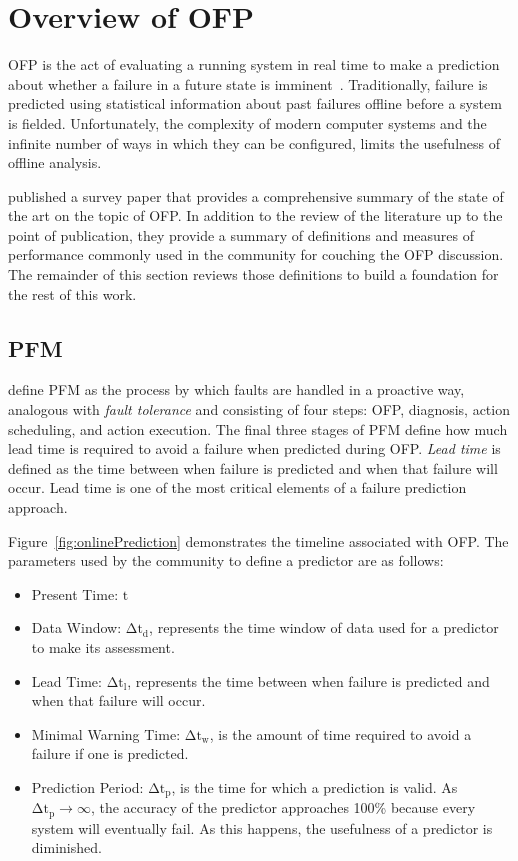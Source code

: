 \section{Overview of \acrfull{OFP}} \label{chapter2}
\ac{OFP} is the act of evaluating a running system in real time to make a
prediction about whether a failure in a future state is
imminent~\citep{salfnerSurvey}.  Traditionally, failure is predicted using
statistical information about past failures offline before a system is fielded.
Unfortunately, the complexity of modern computer systems and the infinite
number of ways in which they can be configured, limits the usefulness of
offline analysis.

\citet{salfnerSurvey} published a survey paper that provides a comprehensive
summary of the state of the art on the topic of \ac{OFP}.  In addition to the
review of the literature up to the point of publication, they provide a summary
of definitions and measures of performance commonly used in the community for
couching the \ac{OFP} discussion.  The remainder of this section reviews those
definitions to build a foundation for the rest of this work.

\subsection{\acrfull{PFM}} \label{pfm}
\citet{salfnerSurvey} define \ac{PFM} as the process by which faults are
handled in a proactive way, analogous with \emph{fault tolerance} and
consisting of four steps: \ac{OFP}, diagnosis, action scheduling, and action
execution.  The final three stages of \ac{PFM} define how much lead time is
required to avoid a failure when predicted during \ac{OFP}.  \emph{Lead time}
is defined as the time between when failure is predicted and when that failure
will occur.  Lead time is one of the most critical elements of a failure
prediction approach.


Figure~\ref{fig:onlinePrediction} demonstrates the timeline associated with
\ac{OFP}.  The parameters used by the community to define a predictor are as
follows:
\begin{itemize}
	\item{Present Time: $\mathrm{t}$}
  \item{Data Window: $\mathrm{\Delta t_{d}}$, represents the time window of
  data used for a predictor to make its assessment.}
  \item{Lead Time: $\mathrm{\Delta t_{l}}$, represents the time between when
  failure is predicted and when that failure will occur.}
  \item{Minimal Warning Time: $\mathrm{\Delta t_{w}}$, is the amount of time
  required to avoid a failure if one is predicted.}
  \item{Prediction Period: $\mathrm{\Delta t_{p}}$, is the time for which a
  prediction is valid.  As $\mathrm{\Delta t_{p} \rightarrow \infty}$, the
  accuracy of the predictor approaches 100\% because every system will
  eventually fail.  As this happens, the usefulness of a predictor is
  diminished.}
\end{itemize}

